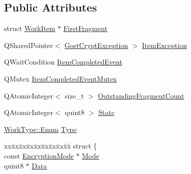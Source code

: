 \subsection*{Public Attributes}
\begin{DoxyCompactItemize}
\item 
struct \hyperlink{struct_gost_crypt_1_1_volume_1_1_encryption_thread_pool_1_1_work_item}{Work\+Item} $\ast$ \hyperlink{struct_gost_crypt_1_1_volume_1_1_encryption_thread_pool_1_1_work_item_aea06f7794eceff20593cee2510e0d020}{First\+Fragment}
\item 
Q\+Shared\+Pointer$<$ \hyperlink{class_gost_crypt_1_1_gost_crypt_exception}{Gost\+Crypt\+Exception} $>$ \hyperlink{struct_gost_crypt_1_1_volume_1_1_encryption_thread_pool_1_1_work_item_a94d9b731b1a1e69cb4648881678cabbf}{Item\+Exception}
\item 
Q\+Wait\+Condition \hyperlink{struct_gost_crypt_1_1_volume_1_1_encryption_thread_pool_1_1_work_item_a7bf15ba428c5424e47181fdc244da8c7}{Item\+Completed\+Event}
\item 
Q\+Mutex \hyperlink{struct_gost_crypt_1_1_volume_1_1_encryption_thread_pool_1_1_work_item_a45cfdd5145958656239181f41b7293c5}{Item\+Completed\+Event\+Mutex}
\item 
Q\+Atomic\+Integer$<$ size\+\_\+t $>$ \hyperlink{struct_gost_crypt_1_1_volume_1_1_encryption_thread_pool_1_1_work_item_abaeb8a922ca38b00b4eac6c725dcecb3}{Outstanding\+Fragment\+Count}
\item 
Q\+Atomic\+Integer$<$ quint8 $>$ \hyperlink{struct_gost_crypt_1_1_volume_1_1_encryption_thread_pool_1_1_work_item_af55fbc62dcfb640d8a101c8455c8f802}{State}
\item 
\hyperlink{struct_gost_crypt_1_1_volume_1_1_encryption_thread_pool_1_1_work_type_ae8c867a2b992c79f01dcc50bab7a448e}{Work\+Type\+::\+Enum} \hyperlink{struct_gost_crypt_1_1_volume_1_1_encryption_thread_pool_1_1_work_item_a7cc7b4ab6c4379994ba0a505fe1b62bf}{Type}
\item 
\begin{tabbing}
xx\=xx\=xx\=xx\=xx\=xx\=xx\=xx\=xx\=\kill
struct \{\\
\>const \hyperlink{class_gost_crypt_1_1_volume_1_1_encryption_mode}{EncryptionMode} $\ast$ \hyperlink{struct_gost_crypt_1_1_volume_1_1_encryption_thread_pool_1_1_work_item_a9afe7279cd8ae21d6e797071a0dbf9dd}{Mode}\\
\>quint8 $\ast$ \hyperlink{struct_gost_crypt_1_1_volume_1_1_encryption_thread_pool_1_1_work_item_a8fb46494d66772ac1e51eb4600001348}{Data}\\

\end{tabbing}
\end{DoxyCompactItemize}
